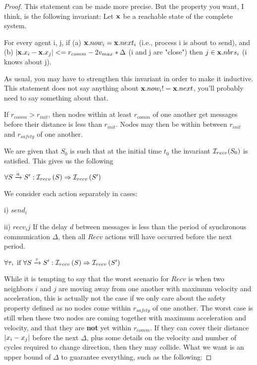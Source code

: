 \documentclass[10pt, conference, compsocconf]{IEEEtran}
\begin{document}
\begin{proof}

This statement can be made more precise. But the property you want, I think, is the following invariant:
Let ${\bf x}$ be a reachable state of the complete system. 

For every agent i, j, 
if 
(a) ${\bf x}.now_i = {\bf x}.next_i$ (i.e., process i is about to send), and
(b) $\lvert{\bf x}.x_i - {\bf x}.x_j\rvert <= r_{comm} - 2v_{max} * \Delta$ (i and j are "close") 
then 
$j \in {\bf x}.nbrs_i$ (i knows about j).

As usual, you may have to strengthen this invariant in order to make it inductive. This statement does not say anything about ${\bf x}.now_i != {\bf x}.next$, you'll probably need to say something about that.

If $r_{comm} > r_{init}$, then nodes within at least $r_{comm}$ of one another get messages before their distance is less than $r_{init}$.  Nodes may then be within between $r_{init}$ and $\mathit{r_{safety}}$ of one another.

We are given that $S_0$ is such that at the initial time $t_0$ the invariant ${\cal I}_{recv}(S_0)$ is satisfied.  This gives us the following

$\forall S \xrightarrow{a} S^{\prime} : {\cal I}_{recv}\left(S\right) \Rightarrow {\cal I}_{recv}\left(S^{\prime}\right)$

We consider each action separately in cases:

i) $send_i$

ii) $recv_ij$
If the delay $d$ between messages is less than the period of synchronous communication $\Delta$, then all $Recv$ actions will have occurred before the next period.

$\forall \tau,\textrm{ if } \forall S \xrightarrow{\tau} S^{\prime} : {\cal I}_{recv}\left(S\right) \Rightarrow {\cal I}_{recv}\left(S^{\prime}\right)$

While it is tempting to say that the worst scenario for $Recv$ is when two neighbors $i$ and $j$ are moving away from one another with maximum velocity and acceleration, this is actually not the case if we only care about the safety property defined as no nodes come within $\mathit{r_{safety}}$ of one another.  The worst case is still when these two nodes are coming together with maximum acceleration and velocity, and that they are \textbf{not} yet within $r_{comm}$.  If they can cover their distance $\lvert x_i - x_j\rvert$ before the next $\Delta$, plus some details on the velocity and number of cycles required to change direction, then they may collide.  What we want is an upper bound of $\Delta$ to guarantee everything, such as the following:


\end{proof}
\end{document}
